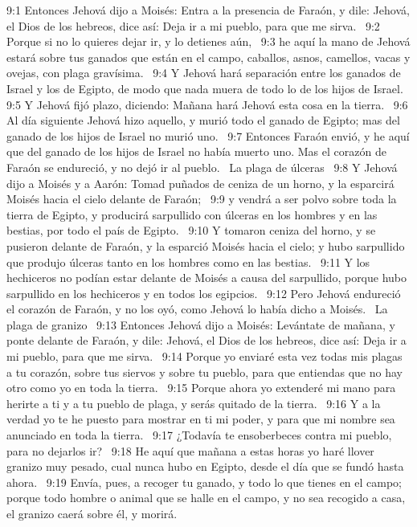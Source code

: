 9:1 Entonces Jehová dijo a Moisés: Entra a la presencia de Faraón, y dile: Jehová, el Dios de los hebreos, dice así: Deja ir a mi pueblo, para que me sirva.  
9:2 Porque si no lo quieres dejar ir, y lo detienes aún,  
9:3 he aquí la mano de Jehová estará sobre tus ganados que están en el campo, caballos, asnos, camellos, vacas y ovejas, con plaga gravísima.  
9:4 Y Jehová hará separación entre los ganados de Israel y los de Egipto, de modo que nada muera de todo lo de los hijos de Israel.  
9:5 Y Jehová fijó plazo, diciendo: Mañana hará Jehová esta cosa en la tierra.  
9:6 Al día siguiente Jehová hizo aquello, y murió todo el ganado de Egipto; mas del ganado de los hijos de Israel no murió uno.  
9:7 Entonces Faraón envió, y he aquí que del ganado de los hijos de Israel no había muerto uno. Mas el corazón de Faraón se endureció, y no dejó ir al pueblo.  
La plaga de úlceras  
9:8 Y Jehová dijo a Moisés y a Aarón: Tomad puñados de ceniza de un horno, y la esparcirá Moisés hacia el cielo delante de Faraón;  
9:9 y vendrá a ser polvo sobre toda la tierra de Egipto, y producirá sarpullido con úlceras en los hombres y en las bestias, por todo el país de Egipto.  
9:10 Y tomaron ceniza del horno, y se pusieron delante de Faraón, y la esparció Moisés hacia el cielo; y hubo sarpullido que produjo úlceras tanto en los hombres como en las bestias.  
9:11 Y los hechiceros no podían estar delante de Moisés a causa del sarpullido, porque hubo sarpullido en los hechiceros y en todos los egipcios.  
9:12 Pero Jehová endureció el corazón de Faraón, y no los oyó, como Jehová lo había dicho a Moisés.  
La plaga de granizo  
9:13 Entonces Jehová dijo a Moisés: Levántate de mañana, y ponte delante de Faraón, y dile: Jehová, el Dios de los hebreos, dice así: Deja ir a mi pueblo, para que me sirva.  
9:14 Porque yo enviaré esta vez todas mis plagas a tu corazón, sobre tus siervos y sobre tu pueblo, para que entiendas que no hay otro como yo en toda la tierra.  
9:15 Porque ahora yo extenderé mi mano para herirte a ti y a tu pueblo de plaga, y serás quitado de la tierra.  
9:16 Y a la verdad yo te he puesto para mostrar en ti mi poder, y para que mi nombre sea anunciado en toda la tierra.  
9:17 ¿Todavía te ensoberbeces contra mi pueblo, para no dejarlos ir?  
9:18 He aquí que mañana a estas horas yo haré llover granizo muy pesado, cual nunca hubo en Egipto, desde el día que se fundó hasta ahora.  
9:19 Envía, pues, a recoger tu ganado, y todo lo que tienes en el campo; porque todo hombre o animal que se halle en el campo, y no sea recogido a casa, el granizo caerá sobre él, y morirá.  

